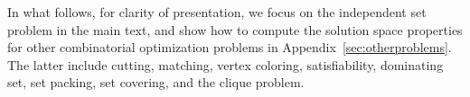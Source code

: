 \documentclass[onefignum, onetabnum]{siamart190516}
\newcommand{\<}{\langle}
\renewcommand{\>}{\rangle}
\newcommand{\App}[1]{Appendix~\ref{#1}}
\newcommand{\xpurple}[1]{[{\bf  \color{purple}{\sout{MC: #1}}}]}
\newcounter{example}
\begin{document}
In what follows, for clarity of presentation, we focus on the independent set problem in the main text, and show how to compute the solution space properties for other combinatorial optimization problems in  \App{sec:otherproblems}. The latter include cutting, matching, vertex coloring, satisfiability,  dominating set,  set packing,  set covering, and the clique problem.
\end{document}
